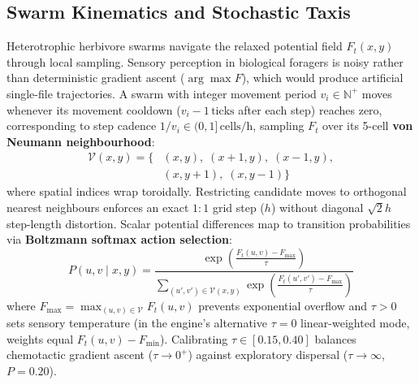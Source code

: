 \subsection{Swarm Kinematics and Stochastic Taxis}
\label{subsec:swarm_kinematics}

Heterotrophic herbivore swarms navigate the relaxed potential field $F_t(x, y)$ through local sampling. Sensory perception in biological foragers is noisy rather than deterministic gradient ascent ($\arg\max F$), which would produce artificial single-file trajectories. A swarm with integer movement period $v_i \in \mathbb{N}^+$ moves whenever its movement cooldown ($v_i - 1\,\text{ticks}$ after each step) reaches zero, corresponding to step cadence $1/v_i \in (0, 1]\,\text{cells/h}$, sampling $F_t$ over its 5-cell \textbf{von Neumann neighbourhood}:
\begin{align}
  \mathcal{V}(x, y) = \big\{ &(x, y), \; (x+1, y), \; (x-1, y), \nonumber \\
  &(x, y+1), \; (x, y-1) \big\}
  \label{eq:von_neumann_neighborhood}
\end{align}
where spatial indices wrap toroidally. Restricting candidate moves to orthogonal nearest neighbours enforces an exact $1:1$ grid step ($h$) without diagonal $\sqrt{2}h$ step-length distortion. Scalar potential differences map to transition probabilities via \textbf{Boltzmann softmax action selection}:
\begin{equation}
  P(u, v \mid x, y) = \frac{\exp\left( \frac{F_t(u, v) - F_{\max}}{\tau} \right)}{\sum_{(u', v') \in \mathcal{V}(x, y)} \exp\left( \frac{F_t(u', v') - F_{\max}}{\tau} \right)}
  \label{eq:boltzmann_softmax}
\end{equation}
where $F_{\max} = \max_{(u, v) \in \mathcal{V}} F_t(u, v)$ prevents exponential overflow and $\tau > 0$ sets sensory temperature (in the engine's alternative $\tau = 0$ linear-weighted mode, weights equal $F_t(u, v) - F_{\min}$). Calibrating $\tau \in [0.15, 0.40]$ balances chemotactic gradient ascent ($\tau \to 0^+$) against exploratory dispersal ($\tau \to \infty$, $P = 0.20$).


